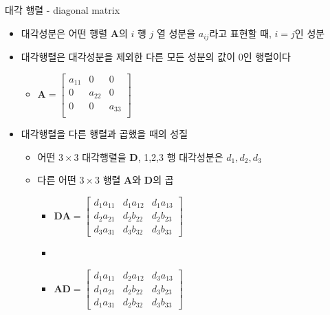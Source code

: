 \documentclass{beamer}
\begin{document}
\begin{frame}{대각 행렬 - diagonal matrix}

\begin{itemize}
\item 대각성분은 어떤 행렬 $\mathbf A$의 $i$ 행 $j$ 열 성분을 $a_{ij}$라고 표현할 때, $i=j$인 성분
\item 대각행렬은 대각성분을 제외한 다른 모든 성분의 값이 0인 행렬이다
	\begin{itemize}
	\item $\mathbf A = \left [ 
		\begin{array}{ccc}
		a_{11} & 0 & 0 \\
		0 & a_{22} & 0 \\
		0 & 0 & a_{33} \\
		\end{array}
		\right ]$
	\end{itemize}
\item 대각행렬을 다른 행렬과 곱했을 때의 성질
	\begin{itemize}
	\item 어떤 $3 \times 3$ 대각행렬을 $\mathbf D$, 1,2,3 행 대각성분은 $d_1, d_2, d_3$
	\item 다른 어떤 $3 \times 3$ 행렬 $\mathbf A$와 $\mathbf D$의 곱
		\begin{itemize}
		\item $\mathbf{DA} = \left [
			\begin{array}{ccc}
			d_1 a_{11} & d_1 a_{12} & d_1 a_{13} \\
			d_2 a_{21} & d_2 b_{22} & d_2 b_{23} \\
			d_3 a_{31} & d_3 b_{32} & d_3 b_{33} 
			\end{array}
			\right ]$
		\item 
		\item $\mathbf{AD} = \left [
			\begin{array}{ccc}
			d_1 a_{11} & d_2 a_{12} & d_3 a_{13} \\
			d_1 a_{21} & d_2 b_{22} & d_3 b_{23} \\
			d_1 a_{31} & d_2 b_{32} & d_3 b_{33}
			\end{array}
			\right ]$
		\end{itemize}
	\end{itemize}
\end{itemize}

\end{frame}
\end{document}
